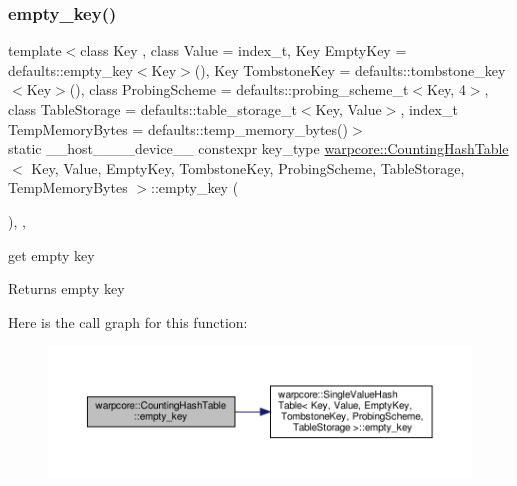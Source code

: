 \subsubsection{\texorpdfstring{empty\+\_\+key()}{empty\_key()}}
{\footnotesize\ttfamily template$<$class Key , class Value  = index\+\_\+t, Key Empty\+Key = defaults\+::empty\+\_\+key$<$\+Key$>$(), Key Tombstone\+Key = defaults\+::tombstone\+\_\+key$<$\+Key$>$(), class Probing\+Scheme  = defaults\+::probing\+\_\+scheme\+\_\+t$<$\+Key, 4$>$, class Table\+Storage  = defaults\+::table\+\_\+storage\+\_\+t$<$\+Key, Value$>$, index\+\_\+t Temp\+Memory\+Bytes = defaults\+::temp\+\_\+memory\+\_\+bytes()$>$ \\
static \+\_\+\+\_\+host\+\_\+\+\_\+\+\_\+\+\_\+device\+\_\+\+\_\+ constexpr key\+\_\+type \hyperlink{classwarpcore_1_1CountingHashTable}{warpcore\+::\+Counting\+Hash\+Table}$<$ Key, Value, Empty\+Key, Tombstone\+Key, Probing\+Scheme, Table\+Storage, Temp\+Memory\+Bytes $>$\+::empty\+\_\+key (\begin{DoxyParamCaption}{ }\end{DoxyParamCaption})\hspace{0.3cm}{\ttfamily [inline]}, {\ttfamily [static]}, {\ttfamily [noexcept]}}



get empty key 

\begin{DoxyReturn}{Returns}
empty key 
\end{DoxyReturn}
Here is the call graph for this function\+:
\nopagebreak
\begin{figure}[H]
\begin{center}
\leavevmode
\includegraphics[width=350pt]{classwarpcore_1_1CountingHashTable_a90cb2cc9918717e35e8379437c6f78cf_cgraph}
\end{center}
\end{figure}
\mbox{\label{classwarpcore_1_1CountingHashTable_aee43cc21c75f1ad37e79604afa034363}} 
